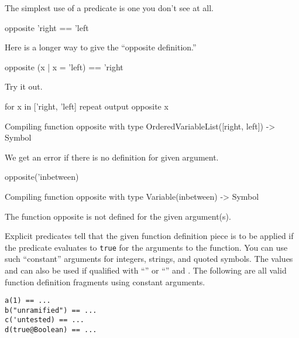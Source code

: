\begin{xtc}
\begin{xtccomment}
The simplest use of a predicate is one you don't see at all.
\end{xtccomment}
\begin{spadsrc}
opposite 'right == 'left
\end{spadsrc}
\end{xtc}
\begin{xtc}
\begin{xtccomment}
Here is a longer way to give the ``opposite definition.''
\end{xtccomment}
\begin{spadsrc}
opposite (x | x = 'left) == 'right
\end{spadsrc}
\end{xtc}
\begin{xtc}
\begin{xtccomment}
Try it out.
\end{xtccomment}
\begin{spadsrc}
for x in ['right, 'left] repeat output opposite x
\end{spadsrc}
\begin{MessageOutput}
   Compiling function opposite with type OrderedVariableList([right,
      left]) -> Symbol 
\end{MessageOutput}
\end{xtc}
\begin{xtc}
\begin{xtccomment}
We get an error if there is no definition for given argument.
\end{xtccomment}
\begin{spadsrc}
opposite('inbetween)
\end{spadsrc}
\begin{MessageOutput}
   Compiling function opposite with type Variable(inbetween) -> Symbol 
\end{MessageOutput}
\begin{MessageOutput}
   The function opposite is not defined for the given argument(s).
\end{MessageOutput}
\end{xtc}

Explicit predicates tell \Language{} that the given function definition
piece is to be applied if the predicate evaluates to {\tt true} for the
arguments to the function.
You can use such ``constant'' arguments for integers,
strings, and quoted symbols.
The  values  and  can also be used
if qualified with ``'' or ``\spad{$}'' %
and .
The following are all valid function definition fragments using
constant arguments.
\begin{verbatim}
a(1) == ...
b("unramified") == ...
c('untested) == ...
d(true@Boolean) == ...
\end{verbatim}

